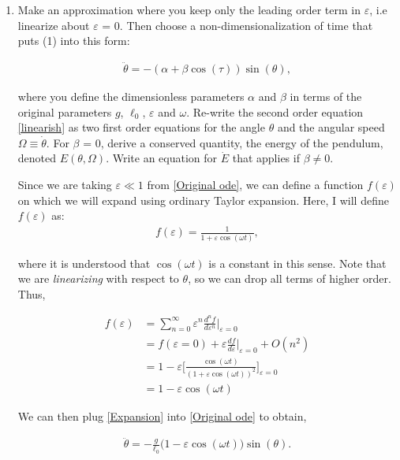 \documentclass[12pt]{article}
\newcommand{\ep}{\varepsilon}
\begin{document}
\begin{enumerate}[]
    \item Make an approximation where you keep only the leading order term in $\ep$, i.e linearize about $\varepsilon$ = 0. Then choose a non-dimensionalization of time that puts (1) into this form:

    \begin{align}
        \ddot{\theta} = -(\alpha + \beta \cos(\tau))\sin(\theta),   \label{linearish}
    \end{align}

        where you define the dimensionless parameters $\alpha$ and $\beta$ in terms of the original parameters $g$, $\ell_0$, $\varepsilon$ and $\omega$. Re-write the second order equation \ref{linearish} as two first order equations for the angle $\theta$ and the angular speed $\Omega \equiv \dot{\theta}$. For $\beta$ = 0, derive a conserved quantity, the energy of the pendulum, denoted $E(\theta, \Omega)$. Write an equation for $\dot{E}$ that applies if $\beta \neq 0$.
        \begin{solution}

        Since we are taking $\ep \ll 1$ from \ref{Original ode}, we can define a function $f(\ep)$ on which we will expand using ordinary Taylor expansion. Here, I will define $f(\ep)$ as:
        \begin{align}
            f(\ep) = \frac{1}{1 + \ep \cos(\omega t)},
        \end{align}

        where it is understood that $\cos(\omega t)$ is a constant in this sense. Note that we are \textit{linearizing} with respect to $\theta$, so we can drop all terms of higher order. Thus, 

        \begin{align}
            f(\ep) &= \sum_{n = 0}^\infty \ep^n\frac{d^nf}{d\ep^n} \Big\rvert_{\ep = 0} \nonumber \\
            &= f(\ep = 0) + \ep\frac{df}{d\ep} \Big\rvert_{\ep = 0} + O(n^2)  \nonumber \\
            &= 1 - \ep \bigg[ \frac{\cos(\omega t)}{(1 + \ep\cos(\omega t))^2} \bigg]_{\ep = 0}  \nonumber \\
            & = 1 - \ep \cos(\omega t) \label{Expansion} 
        \end{align}

        We can then plug \ref{Expansion} into \ref{Original ode} to obtain,

        \begin{align}
            \ddot{\theta} = -\frac{g}{\ell_0}\Big(1 - \ep \cos(\omega t)\Big)\sin(\theta). \label{before parameters}
        \end{align}


\end{solution}
\end{enumerate}
\end{document}

